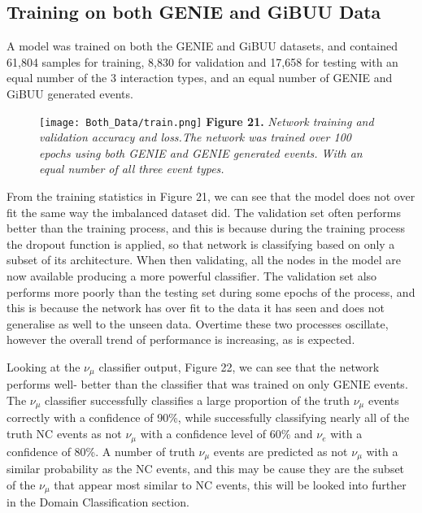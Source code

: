 \subsection{Training on both GENIE and GiBUU Data}

\noindent A model was trained on both the GENIE and GiBUU datasets, and contained 61,804 samples for training, 8,830 for validation and 17,658 for testing with an equal number of the 3 interaction types, and an equal number of GENIE and GiBUU generated events.\medskip

\begin{figure}[t!]
 \centering
 \texttt{[image: Both\_Data/train.png]}
 \textbf{Figure 21.} \textit{Network training and validation accuracy and loss.The network was trained over 100 epochs using both GENIE and GENIE generated events. With an equal number of all three event types. }
\end{figure}

\noindent From the training statistics in Figure 21, we can see that the model does not over fit the same way the imbalanced dataset did. The validation set often performs better than the training process, and this is because during the training process the dropout function is applied, so that network is classifying based on only a subset of its architecture. When then validating, all the nodes in the model are now available producing a more powerful classifier. The validation set also performs more poorly than the testing set during some epochs of the process, and this is because the network has over fit to the data it has seen and does not generalise as well to the unseen data. Overtime these two processes oscillate, however the overall trend of performance is increasing, as is expected.\medskip

\noindent Looking at the $\nu_\mu$ classifier output, Figure 22, we can see that the network performs well- better than the classifier that was trained on only GENIE events. The $\nu_\mu$ classifier successfully classifies a large proportion of the truth $\nu_\mu$ events correctly with a confidence of 90\%, while successfully classifying nearly all of the truth NC events as not $\nu_\mu$ with a confidence level of 60\% and $\nu_e$ with a confidence of 80\%. A number of truth $\nu_\mu$ events are predicted as not $\nu_\mu$ with a similar probability as the NC events, and this may be cause they are the subset of the $\nu_\mu$ that appear most similar to NC events, this will be looked into further in the Domain Classification section.\medskip

